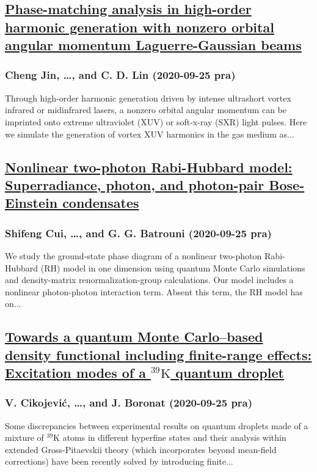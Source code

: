 \subsection*{\href{http://link.aps.org/doi/10.1103/PhysRevA.102.033113}{Phase-matching analysis in high-order harmonic generation with nonzero orbital angular momentum Laguerre-Gaussian beams}}
\subsubsection*{Cheng Jin, \dots, and C. D. Lin (2020-09-25 pra)}
Through high-order harmonic generation driven by intense ultrashort vortex infrared or midinfrared lasers, a nonzero orbital angular momentum can be imprinted onto extreme ultraviolet (XUV) or soft-x-ray (SXR) light pulses. Here we simulate the generation of vortex XUV harmonics in the gas medium as...
\subsection*{\href{http://link.aps.org/doi/10.1103/PhysRevA.102.033334}{Nonlinear two-photon Rabi-Hubbard model: Superradiance, photon, and photon-pair Bose-Einstein condensates}}
\subsubsection*{Shifeng Cui, \dots, and G. G. Batrouni (2020-09-25 pra)}
We study the ground-state phase diagram of a nonlinear two-photon Rabi-Hubbard (RH) model in one dimension using quantum Monte Carlo simulations and density-matrix renormalization-group calculations. Our model includes a nonlinear photon-photon interaction term. Absent this term, the RH model has on...
\subsection*{\href{http://link.aps.org/doi/10.1103/PhysRevA.102.033335}{Towards a quantum Monte Carlo–based density functional including finite-range effects: Excitation modes of a $^{39}\mathrm{K}$ quantum droplet}}
\subsubsection*{V. Cikojević, \dots, and J. Boronat (2020-09-25 pra)}
Some discrepancies between experimental results on quantum droplets made of a mixture of $^{39}\mathrm{K}$ atoms in different hyperfine states and their analysis within extended Gross-Pitaevskii theory (which incorporates beyond mean-field corrections) have been recently solved by introducing finite...
